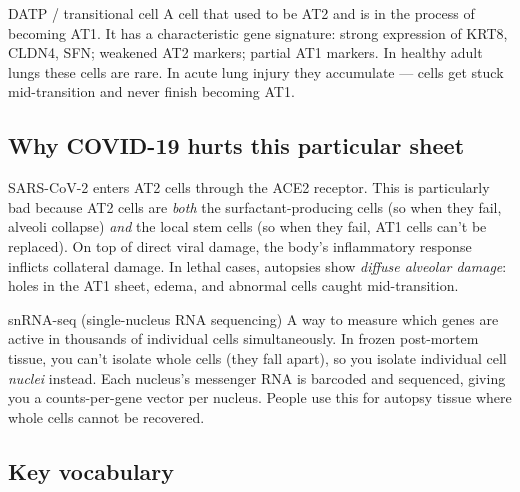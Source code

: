 \documentclass[11pt]{article}
\begin{document}
\begin{jargon}{DATP / transitional cell}
A cell that used to be AT2 and is in the process of becoming AT1. It has a characteristic gene signature: strong expression of KRT8, CLDN4, SFN; weakened AT2 markers; partial AT1 markers. In healthy adult lungs these cells are rare. In acute lung injury they accumulate --- cells get stuck mid-transition and never finish becoming AT1.
\end{jargon}

\subsection{Why COVID-19 hurts this particular sheet}

SARS-CoV-2 enters AT2 cells through the ACE2 receptor. This is particularly bad because AT2 cells are \emph{both} the surfactant-producing cells (so when they fail, alveoli collapse) \emph{and} the local stem cells (so when they fail, AT1 cells can't be replaced). On top of direct viral damage, the body's inflammatory response inflicts collateral damage. In lethal cases, autopsies show \emph{diffuse alveolar damage}: holes in the AT1 sheet, edema, and abnormal cells caught mid-transition.

\begin{jargon}{snRNA-seq (single-nucleus RNA sequencing)}
A way to measure which genes are active in thousands of individual cells simultaneously. In frozen post-mortem tissue, you can't isolate whole cells (they fall apart), so you isolate individual cell \emph{nuclei} instead. Each nucleus's messenger RNA is barcoded and sequenced, giving you a counts-per-gene vector per nucleus. People use this for autopsy tissue where whole cells cannot be recovered.
\end{jargon}

\subsection{Key vocabulary}
\end{document}
